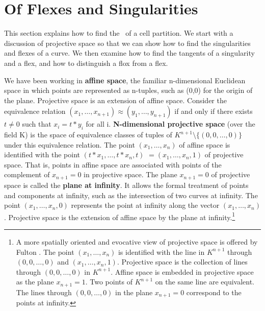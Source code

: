 \section{Of Flexes and Singularities}
\label{sec-flexsing}

This section explains how to find the \walls\ of a cell partition.
We start with a discussion of projective space so that we can show how to
find the singularities and flexes of a curve.
We then examine how to find the tangents of a singularity and a flex,
and how to distinguish a flox from a flex.

We have been working in {\bf affine space}, the familiar n-dimensional
Euclidean space in which points are represented as n-tuples, such as
(0,0) for the origin of the plane.
Projective space is an extension of affine space.
Consider the equivalence relation 
$ (x_{1},\ldots,x_{n+1}) \approx (y_{1},\ldots,y_{n+1})$ if and only if
there exists $t \neq 0$ such that $x_{i} = t*y_{i}$
for all i.
{\bf N-dimensional projective space} (over the field K) is the space of
equivalence classes of tuples of $K^{n+1} \setminus \{(0,0,\ldots,0)\}$
under this equivalence relation.
The point \mbox{$(x_{1},\ldots,x_{n})$} of affine space is identified with the
point \mbox{$(t*x_{1},\ldots,t*x_{n},t)$} \mbox{$= (x_{1},\ldots,x_{n},1)$} 
of projective space.
That is, points in affine space are associated with 
points of the complement of $x_{n+1} = 0$ in projective space.
The plane $x_{n+1} = 0$ of projective space is called the {\bf plane
at infinity}.
It allows the formal treatment of points and components at infinity, such
as the intersection of two curves at infinity.
The point $(x_{1},\ldots,x_{n},0)$ represents the point at infinity along
the vector $(x_{1},\ldots,x_{n})$.
Projective space is the extension of affine space by the plane
at infinity.\footnote{A more spatially oriented and evocative view of 
projective space is offered by Fulton \cite{fulton}.  
The point $(x_{1},\ldots,x_{n})$ is identified with the line in $K^{n+1}$
through $(0,0,\ldots,0)$ and $(x_{1},\ldots,x_{n},1)$.
Projective space is the collection of lines through $(0,0,\ldots,0)$
in $K^{n+1}$.
Affine space is embedded in projective space as the plane $x_{n+1} = 1$.
Two points of $K^{n+1}$ on the same line are equivalent.
The lines through $(0,0,\ldots,0)$ in the plane $x_{n+1} = 0$ correspond
to the points at infinity.}

